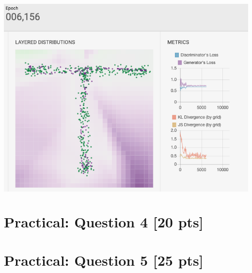 \documentclass{article}
\begin{document}
\includegraphics[scale=.5]{../src/gan_lab.png}

\section{Practical: Question 4 [20 pts]}

\section{Practical: Question 5 [25 pts]}
\end{document}
